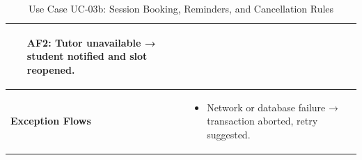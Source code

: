 \begin{table}[H]
\begin{tabular}{|p{3cm}|p{11cm}|}
\begin{itemize}
    \item[AF2:] Tutor unavailable → student notified and slot reopened.
\end{itemize} \\
\hline
\textbf{Exception Flows} &
\begin{itemize}
    \item Network or database failure → transaction aborted, retry suggested.
\end{itemize} \\
\hline
\end{tabular}
\caption{Use Case UC-03b: Session Booking, Reminders, and Cancellation Rules}
\end{table}
